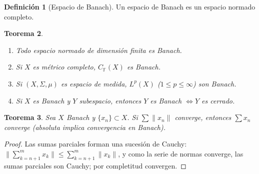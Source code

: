 \documentclass[11pt]{article}
\theoremstyle{definition}
\newtheorem{definition}{Definición}[section]
\theoremstyle{plain}
\newtheorem{theorem}[definition]{Teorema}
\begin{document}
\begin{definition}[Espacio de Banach]
Un espacio de Banach es un espacio normado completo.
\end{definition}

\begin{theorem}
\begin{enumerate}[label=(\arabic*)]
\item Todo espacio normado de dimensión finita es Banach.
\item Si $X$ es métrico completo, $C_\mathbb{F}(X)$ es Banach.
\item Si $(X,\Sigma,\mu)$ es espacio de medida, $L^p(X)$ ($1\le p\le\infty$) son Banach.
\item Si $X$ es Banach y $Y$ subespacio, entonces $Y$ es Banach $\iff Y$ es cerrado.
\end{enumerate}
\end{theorem}

\begin{theorem}
Sea $X$ Banach y $\{x_n\}\subset X$. Si $\sum\|x_n\|$ converge, entonces $\sum x_n$ converge (absoluta implica convergencia en Banach).
\end{theorem}
\begin{proof}
Las sumas parciales forman una sucesión de Cauchy: $\|\sum_{k=n+1}^m x_k\|\le\sum_{k=n+1}^m\|x_k\|$, y como la serie de normas converge, las sumas parciales son Cauchy; por completitud convergen.
\end{proof}
\end{document}
